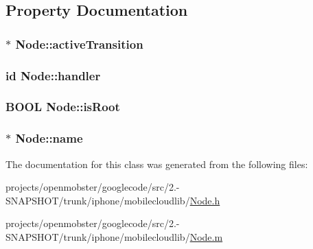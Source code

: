 \subsection{\-Property \-Documentation}
\hypertarget{interface_node_a4df1a0e35dd5590c29156a653b809da7}{
\subsubsection[{active\-Transition}]{ $\ast$ \-Node\-::active\-Transition}}
\label{interface_node_a4df1a0e35dd5590c29156a653b809da7}
\hypertarget{interface_node_ab23f37e56c98ce84725ebc133098bae5}{
\subsubsection[{handler}]{\setlength{\rightskip}{0pt plus 5cm}id \-Node\-::handler}}
\label{interface_node_ab23f37e56c98ce84725ebc133098bae5}
\hypertarget{interface_node_a6a5bd06c318b95452727f5a354e7eb60}{
\subsubsection[{is\-Root}]{\setlength{\rightskip}{0pt plus 5cm}\-B\-O\-O\-L \-Node\-::is\-Root}}
\label{interface_node_a6a5bd06c318b95452727f5a354e7eb60}
\hypertarget{interface_node_aad6e01bce03adb9160d78b85009888db}{
\subsubsection[{name}]{ $\ast$ \-Node\-::name}}
\label{interface_node_aad6e01bce03adb9160d78b85009888db}


\-The documentation for this class was generated from the following files\-:\begin{DoxyCompactItemize}
\item 
projects/openmobster/googlecode/src/2.-\/\-S\-N\-A\-P\-S\-H\-O\-T/trunk/iphone/mobilecloudlib/\hyperlink{_node_8h}{\-Node.\-h}\item 
projects/openmobster/googlecode/src/2.-\/\-S\-N\-A\-P\-S\-H\-O\-T/trunk/iphone/mobilecloudlib/\hyperlink{_node_8m}{\-Node.\-m}\end{DoxyCompactItemize}
